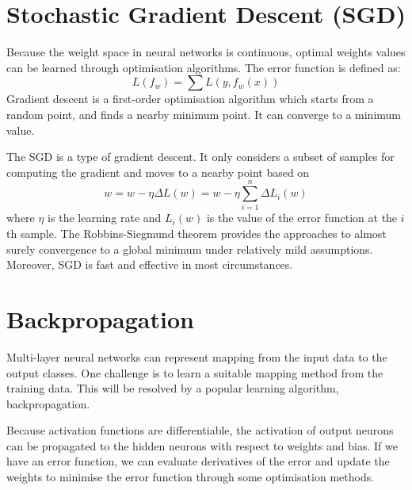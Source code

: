 \section{Stochastic Gradient Descent (SGD)}

Because the weight space in neural networks is continuous, optimal weights values can be learned through optimisation algorithms. The error function is defined as:
\begin{equation}\label{eq:LossMin}
L(f_{w}) = \sum L(y, f_{w}(x))
\end{equation}
Gradient descent is a first-order optimisation algorithm which starts from a random point, and finds a nearby minimum point. It can converge to a minimum value.

The SGD is a type of gradient descent. It only considers a subset of samples for computing the gradient and moves to a nearby point based on
\begin{equation}\label{eq:SGDUpdate}
w = w - \eta  \Delta L(w) = w - \eta \sum_{i=1}^{n} \Delta L_{i}(w)
\end{equation}
where $\eta$ is the learning rate and $L_{i}(w)$ is the value of the error function at the $i$th sample. The Robbins-Siegmund theorem \citep{robbins1985convergence} provides the approaches to almost surely convergence to a global minimum under relatively mild assumptions. Moreover, SGD is fast and effective in most circumstances.

\section{Backpropagation}

Multi-layer neural networks can represent mapping from the input data to the output classes. One challenge is to learn a suitable mapping method from the training data. This will be resolved by a popular learning algorithm, backpropagation.

Because activation functions are differentiable, the activation of output neurons can be propagated to the hidden neurons with respect to weights and bias. If we have an error function, we can evaluate derivatives of the error and update the weights to minimise the error function through some optimisation methods.

